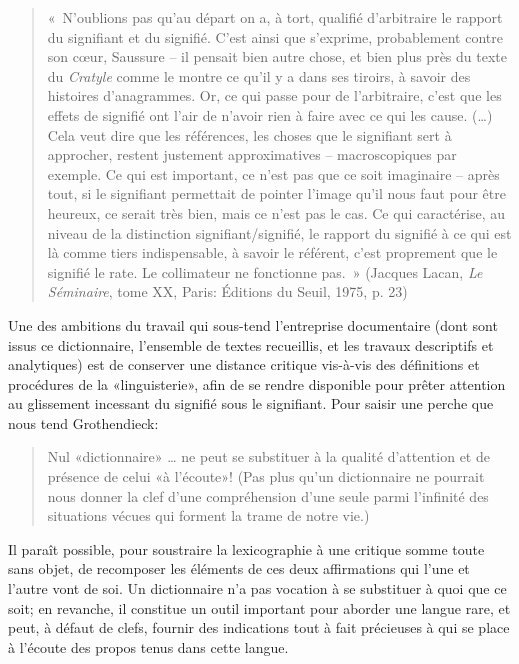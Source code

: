 \begin{quote}
« N'oublions pas qu'au départ on a, à tort, qualifié d'arbitraire le rapport du signifiant et du signifié. C'est ainsi que s'exprime, probablement contre son cœur, Saussure -- il pensait bien autre chose, et bien plus près du texte du \emph{Cratyle} comme le montre ce qu'il y a dans ses tiroirs, à savoir des histoires d'anagrammes. Or, ce qui passe pour de l'arbitraire, c'est que les effets de signifié ont l'air de n'avoir rien à faire avec ce qui les cause.
(…) Cela veut dire que les références, les choses que le signifiant sert à approcher, restent justement approximatives -- macroscopiques par exemple. Ce qui est important, ce n'est pas que ce soit imaginaire -- après tout, si le signifiant permettait de pointer l'image qu'il nous faut pour être heureux, ce serait très bien, mais ce n'est pas le cas. Ce qui caractérise, au niveau de la distinction signifiant/signifié, le rapport du signifié à ce qui est là comme tiers indispensable, à savoir le référent, c'est proprement que le signifié le rate. Le collimateur ne fonctionne pas. » (Jacques Lacan, \emph{Le Séminaire}, tome XX, Paris: Éditions du Seuil, 1975, p. 23)
\end{quote}

Une des ambitions du travail qui sous-tend l'entreprise documentaire (dont sont issus ce dictionnaire, l'ensemble de textes recueillis, et les travaux descriptifs et analytiques) est de conserver une distance critique vis-à-vis des définitions et procédures de la «linguisterie», afin de se rendre disponible pour prêter attention au glissement incessant du signifié sous le signifiant. Pour saisir une perche que nous tend Grothendieck:

\begin{quotation}
    Nul «dictionnaire» {\dots} ne peut se substituer à la qualité d'attention et de présence de celui «à l'écoute»! (Pas plus qu'un dictionnaire ne pourrait nous donner la clef d'une compréhension d'une seule parmi l'infinité des situations vécues qui forment la trame de notre vie.) \cite[1257]{grothendieck_recoltes_2021}
\end{quotation}

Il paraît possible, pour soustraire la lexicographie à une critique somme toute sans objet, de recomposer les éléments de ces deux affirmations qui l'une et l'autre vont de soi. Un dictionnaire n'a pas vocation à se substituer à quoi que ce soit; en revanche, il constitue un outil important pour aborder une langue rare, et peut, à défaut de clefs, fournir des indications tout à fait précieuses à qui se place à l'écoute des propos tenus dans cette langue.

